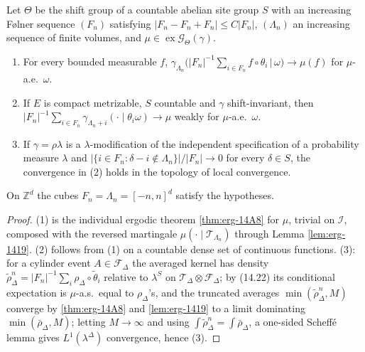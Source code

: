 \begin{theorem}[Georgii (14.20)]
    \label{thm:erg-1420}
    \leanok

    Let $\Theta$ be the shift group of a countable abelian site group $S$ with an increasing
    Følner sequence $(F_n)$ satisfying $|F_n - F_n + F_n| \leq C|F_n|$, $(\Lambda_n)$ an
    increasing sequence of finite volumes, and $\mu \in \operatorname{ex}\mathcal G_\Theta(\gamma)$.
    \begin{enumerate}
    \item For every bounded measurable $f$,
      $\gamma_{\Lambda_n}\bigl(|F_n|^{-1}\sum_{i \in F_n} f \circ \theta_i \,\big|\, \omega\bigr)
      \to \mu(f)$ for $\mu$-a.e.\ $\omega$.
    \item If $E$ is compact metrizable, $S$ countable and $\gamma$ shift-invariant, then
      $|F_n|^{-1}\sum_{i \in F_n} \gamma_{\Lambda_n + i}(\cdot \mid \theta_i\omega) \to \mu$
      weakly for $\mu$-a.e.\ $\omega$.
    \item If $\gamma = \rho\lambda$ is a $\lambda$-modification of the independent specification
      of a probability measure $\lambda$ and
      $|\{i \in F_n : \delta - i \notin \Lambda_n\}|/|F_n| \to 0$ for every $\delta \in S$, the
      convergence in (2) holds in the topology of local convergence.
    \end{enumerate}
    On $\mathbb Z^d$ the cubes $F_n = \Lambda_n = [-n,n]^d$ satisfy the hypotheses.
\end{theorem}
\begin{proof}
    \leanok
    (1) is the individual ergodic theorem \ref{thm:erg-14A8} for $\mu$, trivial on $\mathcal I$,
    composed with the reversed martingale $\mu(\cdot \mid \mathcal T_{\Lambda_n})$ through Lemma
    \ref{lem:erg-1419}. (2) follows from (1) on a countable dense set of continuous functions.
    (3): for a cylinder event $A \in \mathcal F_\Delta$ the averaged kernel has density
    $\tilde\rho^n_\Delta = |F_n|^{-1}\sum_i \rho_\Delta \circ \tilde\theta_i$ relative to
    $\lambda^S$ on $\mathcal T_\Delta \otimes \mathcal F_\Delta$; by (14.22) its conditional
    expectation is $\mu$-a.s.\ equal to $\rho_\Delta$'s, and the truncated averages
    $\min(\tilde\rho^n_\Delta, M)$ converge by \ref{thm:erg-14A8} and \ref{lem:erg-1419} to a
    limit dominating $\min(\bar\rho_\Delta, M)$; letting $M \to \infty$ and using
    $\int \tilde\rho^n_\Delta = \int \bar\rho_\Delta$, a one-sided Scheffé lemma gives
    $L^1(\lambda^\Delta)$ convergence, hence (3).
\end{proof}

